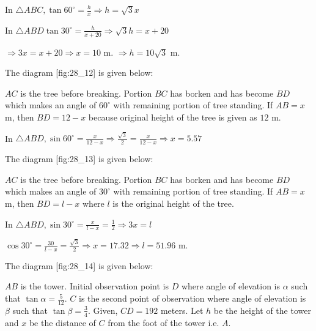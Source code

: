   In $\triangle ABC, \tan60^\circ = \frac{h}{x} \Rightarrow h = \sqrt{3}x$

  In $\triangle ABD \tan30^\circ = \frac{h}{x + 20}\Rightarrow \sqrt{3}h = x + 20$

  $\Rightarrow 3x = x + 20 \Rightarrow x = 10$ m. $\Rightarrow h = 10\sqrt{3}$ m.

\item The diagram [fig:28_12] is given below:

  \startplacefigure[reference=fig:28_12]
    \externalfigure[28_12.pdf]
  \stopplacefigure

  $AC$ is the tree before breaking. Portion $BC$ has borken and has become $BD$ which makes an angle of
  $60^\circ$ with remaining portion of tree standing. If $AB = x$ m, then $BD = 12 - x$ because original height
  of the tree is given as $12$ m.

  In $\triangle ABD, \sin60^\circ = \frac{x}{12 - x} \Rightarrow \frac{\sqrt{3}}{2} = \frac{x}{12 - x} \Rightarrow x = 5.57$

\item The diagram [fig:28_13] is given below:

  \startplacefigure[reference=fig:28_13]
    \externalfigure[28_13.pdf]
  \stopplacefigure

  $AC$ is the tree before breaking. Portion $BC$ has borken and has become $BD$ which makes an angle of
  $30^\circ$ with remaining portion of tree standing. If $AB = x$ m, then $BD = l - x$ where $l$ is the
  original height of the tree.

  In $\triangle ABD, \sin30^\circ = \frac{x}{l - x} = \frac{1}{2} \Rightarrow 3x = l$

  $\cos30^\circ = \frac{30}{l - x} = \frac{\sqrt{3}}{2} \Rightarrow x = 17.32 \Rightarrow l = 51.96$ m.

\item The diagram [fig:28_14] is given below:

  \startplacefigure[reference=fig:28_14]
    \externalfigure[28_14.pdf]
  \stopplacefigure

  $AB$ is the tower. Initial observation point is $D$ where angle of elevation is $\alpha$ such that
  $\tan\alpha = \frac{5}{12}$. $C$ is the second point of observation where angle of elevation is $\beta$ such
  that $\tan\beta = \frac{3}{4}$. Given, $CD = 192$ meters. Let $h$ be the height of the tower and $x$ be
  the distance of $C$ from the foot of the tower i.e. $A$.

